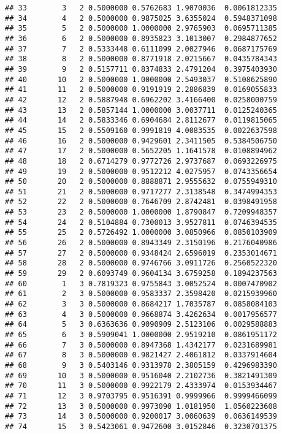 \documentclass[
]{article}
\begin{document}
\begin{verbatim}
## 33        3   2 0.5000000 0.5762683 1.9070036  0.0061812335
## 34        4   2 0.5000000 0.9875025 3.6355024  0.5948371098
## 35        5   2 0.5000000 1.0000000 2.9765903  0.0695711385
## 36        6   2 0.5000000 0.8935823 3.1013007  0.2984877652
## 37        7   2 0.5333448 0.6111099 2.0027946  0.0687175769
## 38        8   2 0.5000000 0.8771918 2.0215667  0.0435784343
## 39        9   2 0.5157711 0.8374833 2.4791204  0.3975403930
## 40       10   2 0.5000000 1.0000000 2.5493037  0.5108625890
## 41       11   2 0.5000000 0.9191919 2.2886839  0.0169055833
## 42       12   2 0.5887948 0.6962202 3.4166400  0.0258000759
## 43       13   2 0.5857144 1.0000000 3.0037711  0.0125240365
## 44       14   2 0.5833346 0.6904684 2.8112677  0.0119815065
## 45       15   2 0.5509160 0.9991819 4.0083535  0.0022637598
## 46       16   2 0.5000000 0.9429601 2.3411505  0.5384506750
## 47       17   2 0.5000000 0.5652205 1.1641578  0.0108894962
## 48       18   2 0.6714279 0.9772726 2.9737687  0.0693226975
## 49       19   2 0.5000000 0.9512212 4.0275957  0.0743356654
## 50       20   2 0.5000000 0.8888871 2.9555632  0.0755949310
## 51       21   2 0.5000000 0.9717277 2.3138548  0.3474994353
## 52       22   2 0.5000000 0.7646709 2.8742481  0.0398491958
## 53       23   2 0.5000000 1.0000000 1.8790847  0.7209948357
## 54       24   2 0.5104884 0.7300013 3.9527811  0.0746394535
## 55       25   2 0.5726492 1.0000000 3.0850966  0.0850103909
## 56       26   2 0.5000000 0.8943349 2.3150196  0.2176040986
## 57       27   2 0.5000000 0.9348424 2.6596019  0.2353014671
## 58       28   2 0.5000000 0.9746766 3.0911726  0.2560522320
## 59       29   2 0.6093749 0.9604134 3.6759258  0.1894237563
## 60        1   3 0.7819323 0.9755843 3.0052524  0.0007470902
## 61        2   3 0.5000000 0.9583337 2.3598420  0.0215939960
## 62        3   3 0.5000000 0.8684217 1.7035787  0.0858084103
## 63        4   3 0.5000000 0.9668874 3.4262634  0.0017956577
## 64        5   3 0.6363636 0.9090909 2.5123106  0.0029588883
## 65        6   3 0.5909041 1.0000000 2.9519210  0.0861951172
## 66        7   3 0.5000000 0.8947368 1.4342177  0.0231689981
## 67        8   3 0.5000000 0.9821427 2.4061812  0.0337914604
## 68        9   3 0.5403146 0.9313978 2.3805159  0.4296983390
## 69       10   3 0.5000000 0.9516040 2.2102736  0.3821491309
## 70       11   3 0.5000000 0.9922179 2.4333974  0.0153934467
## 71       12   3 0.9703795 0.9516391 0.9999966  0.9999466099
## 72       13   3 0.5000000 0.9973090 1.0181950  1.0560223608
## 73       14   3 0.5000000 0.9200017 3.0060639  0.0636149539
## 74       15   3 0.5423061 0.9472600 3.0152846  0.3230701375

\end{verbatim}
\end{document}
